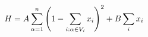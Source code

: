 \documentclass[preview]{standalone}
\begin{document}
\begin{align*}
\special{dvisvgm:raw <g id='unique000'>}H=A\sum_{\alpha=1}^{n} \special{dvisvgm:raw </g>}\special{dvisvgm:raw <g id='unique001'>}\left(1-\sum_{i:\alpha \in V_i} x_i\right)^2 \special{dvisvgm:raw </g>}\special{dvisvgm:raw <g id='unique002'>}+ B\sum_{i} x_i\special{dvisvgm:raw </g>}
\end{align*}
\end{document}
